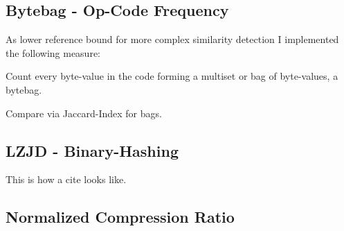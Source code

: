\documentclass[../main.tex]{subfiles}
\begin{document}
\subsection{Bytebag - Op-Code Frequency}
As lower reference bound for more complex similarity detection I implemented the following measure:

\begin{ol}
  \item Count every byte-value in the code forming a multiset or bag of byte-values, a bytebag.
  \item Compare via Jaccard-Index for bags.
\end{ol}

\subsection{LZJD - Binary-Hashing}
This is how a cite\cite{sung2004static} looks like.

\subsection{Normalized Compression Ratio}
\end{document}

